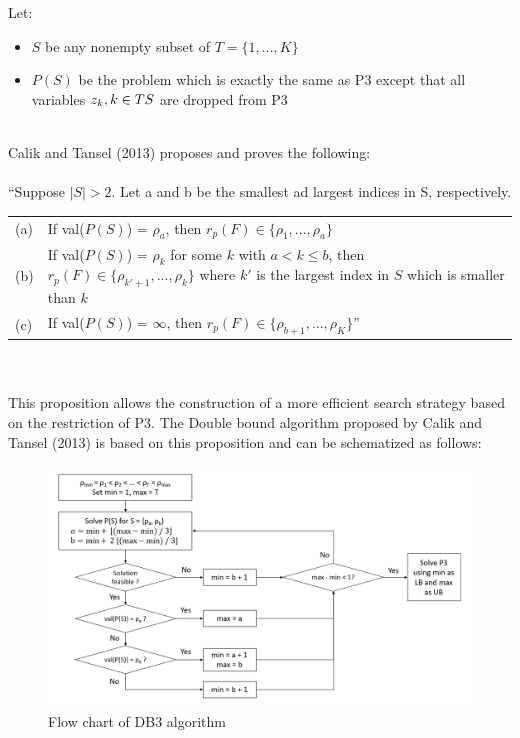 Let:
\begin{itemize}
	\item $S$ be any nonempty subset of $T = \lbrace 1, ..., K \rbrace$
	\item $P(S)$ be the problem which is exactly the same as P3 except that all variables $z_k, k \in T\\S$ are dropped from P3
\end{itemize}\ \\
Calik and Tansel (2013) proposes and proves the following:\\\\
``Suppose $|S| > 2$. Let a and b be the smallest ad largest indices in S, respectively.\\
\begin{tabularx}{\textwidth}{l X}
(a) & If val($P(S)$) = $\rho_a$, then $r_p(F) \in \lbrace \rho_1, ..., \rho_a \rbrace$\\
(b) & If val($P(S)$) = $\rho_k$ for some $k$ with $a < k \leq b$, then $r_p(F) \in \lbrace \rho_{k'+1}, ..., \rho_k \rbrace$ where $k'$ is the largest index in $S$ which is smaller than $k$ \\
(c) & If val($P(S)$) = $\infty$, then $r_p(F) \in \lbrace \rho_{b+1}, ..., \rho_K \rbrace$''\\
\end{tabularx}\ \\\\
This proposition allows the construction of a more efficient search strategy based on the restriction of P3. The Double bound algorithm proposed by Calik and Tansel (2013) is based on this proposition and can be schematized as follows:
\begin{figure}[H]
	\begin{center}
		\includegraphics[width=\textwidth]{../imgs/DB3.png}
		\caption{Flow chart of DB3 algorithm}
	\end{center}
\end{figure}